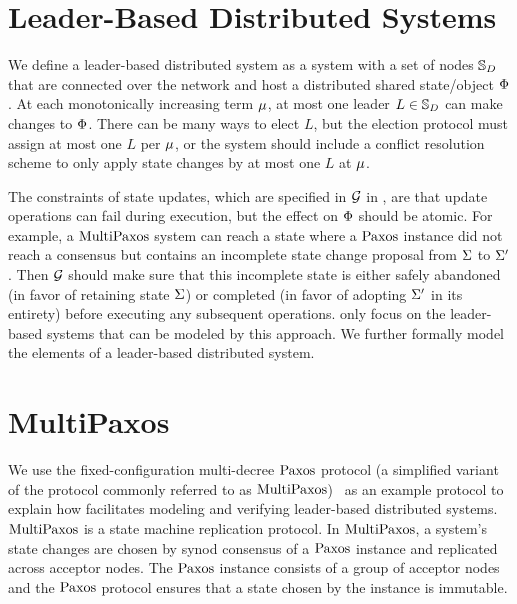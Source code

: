 \section{Leader-Based Distributed Systems}
\label{chapter:witnesspassing:sec:leader-based-distributed-systems}


We define a leader-based distributed system as a system with a set of nodes
$\mathbb{S}_{D}$ that are connected over the network and host a distributed shared state/object
$\Phi$. At each monotonically increasing term $\mu$, at most one leader
$L \in \mathbb{S}_{D}$ can make changes to $\Phi$. There can be many ways to elect
$L$, but the election protocol must assign at most one $L$ per $\mu$,
or the system should include a conflict resolution scheme to only apply
state changes by at most one $L$ at $\mu$.

The constraints of state updates, which are specified in $\mathcal{G}$ in \sysname{},
are that update operations can fail during execution, but the effect on $\Phi$ should be atomic. For example, a $\mathrm{MultiPaxos}$ system can reach a
state where a $\mathrm{Paxos}$ instance did not reach a consensus but contains an
incomplete state change proposal from $\Sigma$ to $\Sigma^\prime$.
Then $\mathcal{G}$ should make sure that this incomplete state is either safely abandoned (in favor of retaining state $\Sigma$)
or completed (in favor of adopting $\Sigma^\prime$ in its entirety)
before executing any subsequent operations. 
\sysname{} only focus on the leader-based systems that can be modeled by this approach.
We further formally model the elements of a leader-based distributed system.

\section{MultiPaxos}
\label{chapter:witnesspassing:multipaxos}

We use the fixed-configuration multi-decree $\mathrm{Paxos}$ protocol (a simplified variant
of the protocol commonly referred to as $\mathrm{MultiPaxos}$)~\cite{rvrpaxos}
as an example protocol to explain how \sysname{} facilitates modeling and
verifying leader-based distributed systems. $\mathrm{MultiPaxos}$ is a
state machine replication protocol. In $\mathrm{MultiPaxos}$, a system's state changes
are chosen by synod consensus of a $\mathrm{Paxos}$ instance and replicated across acceptor nodes.
The $\mathrm{Paxos}$ instance consists of a group of acceptor nodes and the $\mathrm{Paxos}$ protocol
ensures that a state chosen by the instance is immutable.

